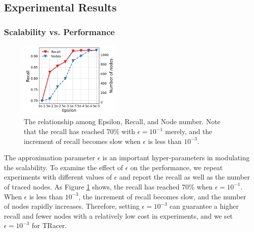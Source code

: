 \subsection{Experimental Results}
\subsubsection{Scalability vs. Performance}
\begin{figure}[t]
    \centering
    \includegraphics[width=0.65\linewidth,height=3.7cm]{figures/epsilon_metrics.png}
    \vskip -0.1in
    \caption{The relationship among Epsilon, Recall, and Node number. Note that the recall has reached 70\% with $\epsilon = 10^{-1}$ merely, and the increment of recall becomes slow when $\epsilon$ is less than $10^{-3}$.}
    \label{fig:epsilon_metrics}
\end{figure}
The approximation parameter $\epsilon$ is an important hyper-parameters in modulating the scalability.
To examine the effect of $\epsilon$ on the performance, we repeat experiments with different values of $\epsilon$ and report the recall as well as the number of traced nodes. 
As Figure \ref{fig:epsilon_metrics} shows, the recall has reached 70\% when $\epsilon = 10^{-1}$.
When $\epsilon$ is less than $10^{-3}$, the increment of recall becomes slow, and the number of nodes rapidly increases. 
Therefore, setting $\epsilon = 10^{-3}$ can guarantee a higher recall and fewer nodes with a relatively low cost in experiments, and we set $\epsilon = 10^{-3}$ for TRacer.


